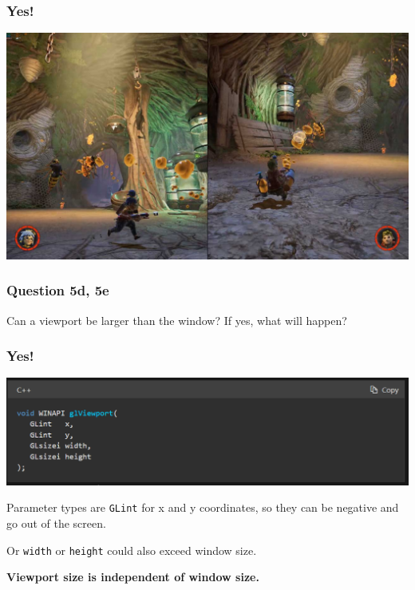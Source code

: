 \documentclass{beamer}
\begin{document}
\begin{frame}
    \frametitle{Yes!}

    \begin{center}
        \includegraphics[scale=0.2]{it-takes-two.jpg}
    \end{center}

\end{frame}

\begin{frame}
    \frametitle{Question 5d, 5e}

    Can a viewport be larger than the window?
    \vspace{1em}
    If yes, what will happen?
\end{frame}

\begin{frame}
    \frametitle{Yes!}

    \begin{center}
        \includegraphics[scale=0.5]{glviewport.png}
    \end{center}

    Parameter types are \texttt{GLint} for x and y coordinates, so they can be negative and go out of the screen.\\

    \vspace{1em}

    Or \texttt{width} or \texttt{height} could also exceed window size.

    \textbf{Viewport size is independent of window size.}

\end{frame}
\end{document}
